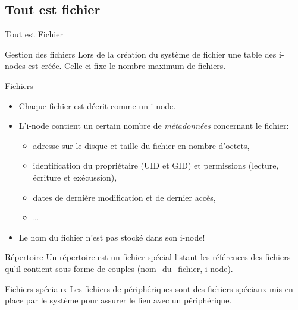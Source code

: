 \subsection{Tout est fichier}
\begin{frame}{Tout est Fichier}
  \begin{block}{Gestion des fichiers}
    Lors de la création du système de fichier une table des i-nodes est créée. Celle-ci fixe le nombre maximum de fichiers.
  \end{block}
  \begin{block}{Fichiers}
    \begin{itemize}
    \item Chaque fichier est décrit comme un i-node.
    \item L'i-node contient un certain nombre de \textit{métadonnées} concernant le fichier:
      \begin{itemize}
      \item adresse sur le disque et taille du fichier en nombre d'octets,
      \item identification du propriétaire (UID et GID) et permissions (lecture, écriture et exécussion),
      \item dates de dernière modification et de dernier accès,
      \item \dots
      \end{itemize}
    \item Le nom du fichier n'est pas stocké dans son i-node!
    \end{itemize}
  \end{block}
  \begin{block}{Répertoire}
    {\color{solarizedAccent}Un répertoire est un fichier} spécial listant les références des fichiers qu'il contient sous forme de couples (nom\_du\_fichier, i-node).
  \end{block}
  \begin{block}{Fichiers spéciaux}
    Les fichiers de périphériques sont des fichiers spéciaux mis en place par le système pour assurer le lien avec un périphérique.
  \end{block}
\end{frame}
